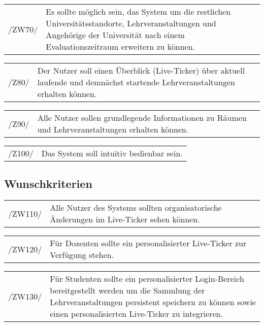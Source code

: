 \begin{tabular}{p{1.5cm}p{14.5cm}}	
	 /ZW70/& Es sollte möglich sein, das System um die restlichen Universitätsstandorte, Lehrveranstaltungen und Angehörige der Universität nach einem Evaluationszeitraum erweitern zu können. \\[0.25cm]
\end{tabular}

\begin{tabular}{p{1.5cm}p{14.5cm}}	
	 /Z80/& Der Nutzer soll einen Überblick (Live-Ticker) über aktuell laufende und demnächst startende Lehrveranstaltungen erhalten können. \\[0.25cm]
\end{tabular}

\begin{tabular}{p{1.5cm}p{14.5cm}}	
	 /Z90/& Alle Nutzer sollen grundlegende Informationen zu Räumen und Lehrveranstaltungen erhalten können. \\[0.25cm]
\end{tabular}

\begin{tabular}{p{1.5cm}p{14.5cm}}	
	 /Z100/& Das System soll intuitiv bedienbar sein. \\[0.25cm]
\end{tabular}

\subsection{Wunschkriterien }


\begin{tabular}{p{1.5cm}p{14.5cm}}	
	 /ZW110/& Alle Nutzer des Systems sollten organisatorische Änderungen im Live-Ticker sehen können. \\[0.25cm]
\end{tabular}

\begin{tabular}{p{1.5cm}p{14.5cm}}	
	 /ZW120/& Für Dozenten sollte ein personalisierter Live-Ticker zur Verfügung stehen. \\[0.25cm]
\end{tabular}

\begin{tabular}{p{1.5cm}p{14.5cm}}	
	 /ZW130/& Für Studenten sollte ein personalisierter Login-Bereich bereitgestellt werden um die Sammlung der Lehrveranstaltungen persistent speichern zu können sowie einen personalisierten Live-Ticker zu integrieren. \\[0.25cm]
\end{tabular}

